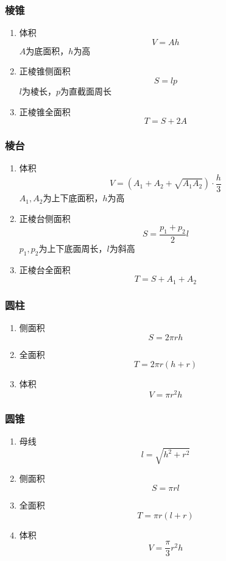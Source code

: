 \documentclass[a4paper]{article}
\begin{document}
\subsubsection{棱锥}

\begin{enumerate}
	\item 体积
		$$V=Ah$$
		$A$为底面积，$h$为高
	\item 正棱锥侧面积
		$$S=lp$$
		$l$为棱长，$p$为直截面周长
	\item 正棱锥全面积
		$$T=S+2A$$
\end{enumerate}

\subsubsection{棱台}

\begin{enumerate}
	\item 体积
		$$V=(A_1+A_2+\sqrt{A_1A_2}) \cdot \frac{h}{3}$$
		$A_1,A_2$为上下底面积，$h$为高
	\item 正棱台侧面积
		$$S=\frac{p_1+p_2}{2}l$$
		$p_1,p_2$为上下底面周长，$l$为斜高
	\item 正棱台全面积
		$$T=S+A_1+A_2$$
\end{enumerate}

\subsubsection{圆柱}

\begin{enumerate}
	\item 侧面积
		$$S=2\pi rh$$
	\item 全面积
		$$T=2\pi r(h+r)$$
	\item 体积
		$$V=\pi r^2h$$
\end{enumerate}

\subsubsection{圆锥}

\begin{enumerate}
	\item 母线
		$$l=\sqrt{h^2+r^2}$$
	\item 侧面积
		$$S=\pi rl$$
	\item 全面积
		$$T=\pi r(l+r)$$
	\item 体积
		$$V=\frac{\pi}{3} r^2h$$
\end{enumerate}
\end{document}
